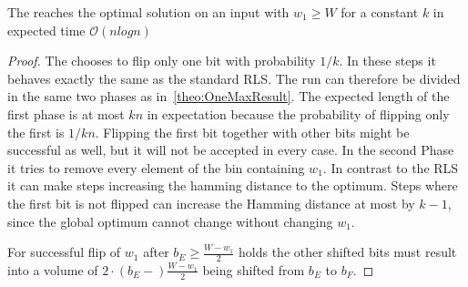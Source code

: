 \begin{lemma}
      The \RLSR reaches the optimal solution on an input with $w_1\ge W$ for a constant $k$ in expected time $\mathcal{O}(nlogn)$
\end{lemma}
\begin{proof}
      The \RLSR chooses to flip only one bit with probability $1/k$.
      In these steps it behaves exactly the same as the standard RLS.
      The run can therefore be divided in the same two phases as in~\ref{theo:OneMaxResult}.
      The expected length of the first phase is at most $kn$ in expectation because the probability of flipping only the first is $1/kn$.
      Flipping the first bit together with other bits might be successful as well, but it will not be accepted in every case.
      In the second Phase it tries to remove every element of the bin containing $w_1$.
      In contrast to the RLS it can make steps increasing the hamming distance to the optimum.
      Steps where the first bit is not flipped can increase the Hamming distance at most by $k-1$, since the global optimum cannot change without changing $w_1$.

      For successful flip of $w_1$ after $b_E \ge \frac{W-w_1}{2}$ holds the other shifted bits must result into a volume of $2\cdot(b_E-)\frac{W-w_1}{2}$ being shifted from $b_E$ to $b_F$.
      
\end{proof}